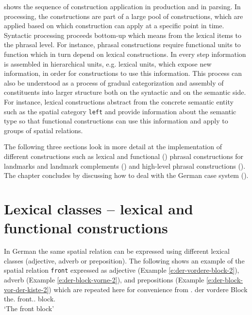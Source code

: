  shows the sequence of 
construction application in production and in parsing. 
In processing, the constructions are part of a 
large pool of constructions, which are applied based on which 
construction can apply at a specific point in time.
Syntactic processing proceeds bottom-up which means from the lexical 
items to the phrasal level. For instance, phrasal constructions require functional 
units to function which in turn depend on lexical constructions. In every
step information is assembled in hierarchical units, e.g. lexical units,
which expose new information, in order for constructions to use this information.
This process can also be understood as a process of gradual categorization
and assembly of constituents into larger structure both on 
the syntactic and on the semantic side. For instance, lexical constructions
abstract from the concrete semantic entity such as the spatial category 
{\footnotesize\tt left} and provide information about
the semantic type so that functional constructions can use this information
and apply to groups of spatial relations.

The following three sections look in more detail at the implementation
of different constructions such as lexical and functional 
() phrasal constructions for landmarks
and landmark complements ()
and high-level phrasal constructions ().
The chapter concludes by discussing how to deal with the German
case system ().


\section{Lexical classes -- lexical and functional constructions}
\label{s:lexical-functional}
In German the same spatial relation can be expressed using different lexical classes
(adjective, adverb or preposition). The following shows 
an example of the spatial relation {\footnotesize\tt front} expressed
as adjective (Example \ref{e:der-vordere-block-2}), adverb (Example \ref{e:der-block-vorne-2}), 
and prepositions (Example \ref{e:der-block-vor-der-kiste-2}) which
are repeated here for convenience from .
\ea
\label{e:der-vordere-block-2}
\gll der vordere Block\\
the.{\NOM} front.{\ADJ}.{\NOM} block.{\NOM}\\
\glt `The front block'\\

